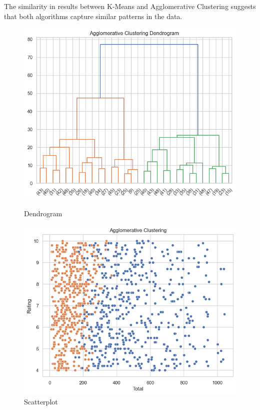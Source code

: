 The similarity in results between K-Means and Agglomerative Clustering suggests that both algorithms capture similar patterns in the data. 
\begin{figure}[h]
    \centering
    \begin{minipage}{0.45\textwidth}
        \centering
        \includegraphics[width=\linewidth]{Chapters/ch8/ch_8_agglo_dendo.png}
        \caption{Dendrogram}
        \label{fig:dendrogram}
    \end{minipage}\hfill
    \begin{minipage}{0.45\textwidth}
        \centering
        \includegraphics[width=\linewidth]{Chapters/ch8/ch_8_agglo_scatter.png}
        \caption{Scatterplot}
        \label{fig:scatterplot}
    \end{minipage}
\end{figure}



